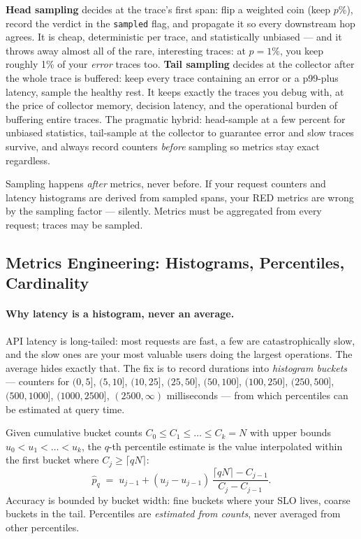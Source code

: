 \textbf{Head sampling} decides at the trace's first span: flip a weighted
coin (keep $p$\%), record the verdict in the \texttt{sampled} flag, and
propagate it so every downstream hop agrees. It is cheap, deterministic per
trace, and statistically unbiased --- and it throws away almost all of the
rare, interesting traces: at $p = 1\%$, you keep roughly 1\% of your
\emph{error} traces too. \textbf{Tail sampling} decides at the collector
after the whole trace is buffered: keep every trace containing an error or
a p99-plus latency, sample the healthy rest. It keeps exactly the traces
you debug with, at the price of collector memory, decision latency, and
the operational burden of buffering entire traces. The pragmatic hybrid:
head-sample at a few percent for unbiased statistics, tail-sample at the
collector to guarantee error and slow traces survive, and always record
counters \emph{before} sampling so metrics stay exact regardless.

\begin{warningbox}
Sampling happens \emph{after} metrics, never before. If your request
counters and latency histograms are derived from sampled spans, your RED
metrics are wrong by the sampling factor --- silently. Metrics must be
aggregated from every request; traces may be sampled.
\end{warningbox}
\subsection{Metrics Engineering: Histograms, Percentiles, Cardinality}
\label{subsec:ch18-metrics-engineering}

\paragraph{Why latency is a histogram, never an average.} API latency is
long-tailed: most requests are fast, a few are catastrophically slow, and
the slow ones are your most valuable users doing the largest operations.
The average hides exactly that. The fix is to record durations into
\emph{histo\-gram buckets} --- counters for $(0,5]$, $(5,10]$, $(10,25]$,
$(25,50]$, $(50,100]$, $(100,250]$, $(250,500]$, $(500,1000]$,
$(1000,2500]$, $(2500,\infty)$ milliseconds --- from which percentiles can
be estimated at query time.

\begin{definition}
Given cumulative bucket counts $C_0 \le C_1 \le \dots \le C_k = N$ with
upper bounds $u_0 < u_1 < \dots < u_k$, the $q$-th percentile estimate is
the value interpolated within the first bucket where $C_j \ge
\lceil q N \rceil$:
\begin{equation}
\hat{p}_q \;=\; u_{j-1} + (u_j - u_{j-1})\,
\frac{\lceil qN \rceil - C_{j-1}}{C_j - C_{j-1}} .
\label{eq:ch18-histpct}
\end{equation}
Accuracy is bounded by bucket width: fine buckets where your SLO lives,
coarse buckets in the tail. Percentiles are \emph{estimated from counts},
never averaged from other percentiles.
\end{definition}

